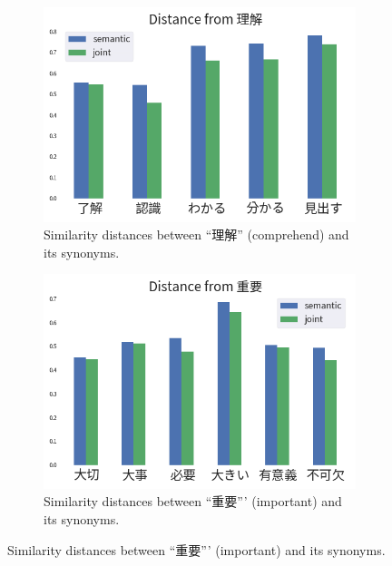 \vspace{0.4cm}
\begin{CJK}{UTF8}{ipxm}
    \begin{figure}[h]
        \centering
        \begin{subfigure}[b]{0.46\textwidth}
            \centering
            \includegraphics[width=\textwidth]{../images/similarity_ja1.png}
            \caption{Similarity distances between ``理解'' (comprehend) and its synonyms.}
            \label{fig:similarity_ja1}
        \end{subfigure}
        \hspace{2em}
        \begin{subfigure}[b]{0.46\textwidth}
            \centering
            \includegraphics[width=\textwidth]{../images/similarity_ja2.png}
            \caption{Similarity distances between ``重要''' (important) and its synonyms.}

\end{subfigure}
\end{figure}
\end{CJK}
